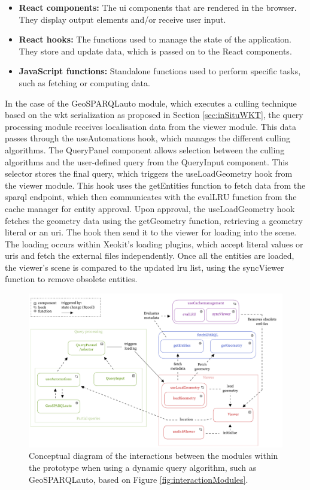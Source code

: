 \begin{itemize}
    \item \textbf{React components:} The \ac{ui} components that are rendered in the browser. They display output elements and/or receive user input.
    \item \textbf{React hooks:} The functions used to manage the state of the application. They store and update data, which is passed on to the React components.
    \item \textbf{JavaScript functions:} Standalone functions used to perform specific tasks, such as fetching or computing data.
\end{itemize}

In the case of the GeoSPARQLauto module, which executes a culling technique based on the \ac{wkt} serialization as proposed in Section \ref{sec:inSituWKT}, the query processing module receives localisation data from the viewer module. This data passes through the useAutomations hook, which manages the different culling algorithms. The QueryPanel component allows selection between the culling algorithms and the user-defined query from the QueryInput component. This selector stores the final query, which triggers the useLoadGeometry hook from the viewer module. This hook uses the getEntities function to fetch data from the \ac{sparql} endpoint, which then communicates with the evalLRU function from the cache manager for entity approval. Upon approval, the useLoadGeometry hook fetches the geometry data using the getGeometry function, retrieving a geometry literal or an \ac{uri}. The hook then send it to the viewer for loading into the scene. The loading occurs within Xeokit's loading plugins, which accept literal values or \ac{uri}s and fetch the external files independently. Once all the entities are loaded, the viewer's scene is compared to the updated \ac{lru} list, using the syncViewer function to remove obsolete entities.

\begin{figure}[H]
    \centering
    \includegraphics[width=\textwidth]{figures/pdf/interactions_prototype.pdf}
    \caption[Interactions prototype]{Conceptual diagram of the interactions between the modules within the prototype when using a dynamic query algorithm, such as GeoSPARQLauto, based on Figure \ref{fig:interactionModules}.}
    \label{fig:interactionPrototype}
\end{figure}

